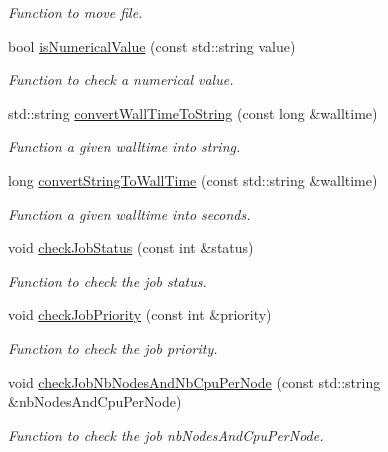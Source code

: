 \begin{DoxyCompactItemize}
\begin{DoxyCompactList}\small\item\em Function to move file. \item\end{DoxyCompactList}\item 
bool \hyperlink{namespacevishnu_a8087df6ef072800cecc1bf4e85d9aca5}{isNumericalValue} (const std::string value)
\begin{DoxyCompactList}\small\item\em Function to check a numerical value. \item\end{DoxyCompactList}\item 
std::string \hyperlink{namespacevishnu_ad5bea19658f717e721e13dacad591b2a}{convertWallTimeToString} (const long \&walltime)
\begin{DoxyCompactList}\small\item\em Function a given walltime into string. \item\end{DoxyCompactList}\item 
long \hyperlink{namespacevishnu_aed3383125fa0df584941fc4dac560e9e}{convertStringToWallTime} (const std::string \&walltime)
\begin{DoxyCompactList}\small\item\em Function a given walltime into seconds. \item\end{DoxyCompactList}\item 
void \hyperlink{namespacevishnu_a8460fc46c76d0b8e7efedbc571487d1f}{checkJobStatus} (const int \&status)
\begin{DoxyCompactList}\small\item\em Function to check the job status. \item\end{DoxyCompactList}\item 
void \hyperlink{namespacevishnu_aa59f3181383172b450f3621192c3ad26}{checkJobPriority} (const int \&priority)
\begin{DoxyCompactList}\small\item\em Function to check the job priority. \item\end{DoxyCompactList}\item 
void \hyperlink{namespacevishnu_a66c4f962fb018f2e5e89d81f06357ca3}{checkJobNbNodesAndNbCpuPerNode} (const std::string \&nbNodesAndCpuPerNode)
\begin{DoxyCompactList}\small\item\em Function to check the job nbNodesAndCpuPerNode. \item\end{DoxyCompactList}\item 

\end{DoxyCompactItemize}
